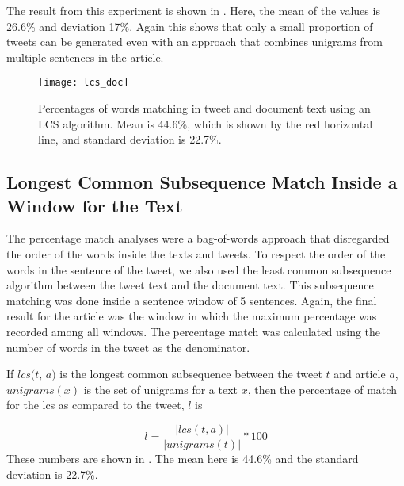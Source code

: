 The result from this experiment is shown in . Here, the mean of the values is 26.6\% and deviation 17\%. Again this shows that only a small proportion of tweets can be generated even with an approach that combines unigrams from multiple sentences in the article.


\begin{figure}[tbp]
\centering
\texttt{[image: lcs\_doc]}
\caption{Percentages of words matching in tweet and document text using an LCS algorithm. Mean is 44.6\%, which is shown by the red horizontal line, and standard deviation is 22.7\%.}
\label{fig:lcs}
\end{figure}


\subsection{Longest Common Subsequence Match Inside a Window for the Text}
\label{sec:lcs}

The percentage match analyses were a bag-of-words approach that disregarded the order of the words inside the texts and tweets. To respect the order of the words in the sentence of the tweet, we also used the least common subsequence algorithm between the tweet text and the document text. This subsequence matching was done inside a sentence window of 5 sentences. 
Again, the final result for the article was the window in which the maximum percentage was recorded among all windows. The percentage match was calculated using the number of words in the tweet as the denominator.

If $\textit{lcs(t, a)}$ is the longest common subsequence between the tweet $t$ and article $a$, $\textit{unigrams}(x)$ is the set of unigrams for a text $x$, then the percentage of match for the lcs as compared to the tweet, $\textit{l}$ is

\begin{equation}
l = \frac{| lcs(t, a) |}{| unigrams(t) |} * 100
\end{equation}
 These numbers are shown in . The mean here is 44.6\% and the standard deviation is 22.7\%. 


